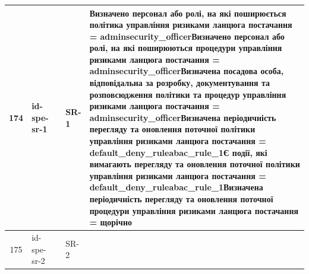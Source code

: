 \documentclass[10pt]{article}
\begin{document}
\begin{longtable}{|c|>{\raggedright\arraybackslash}p{2.5cm}|>{\raggedright\arraybackslash}p{4.5cm}|>{\raggedright\arraybackslash}p{3cm}|>{\raggedright\arraybackslash}p{4.5cm}|}
174 & id-spe-sr-1 &  & SR-1 & Визначено персонал або ролі, на які поширюється політика управління ризиками ланцюга постачання = \textbf{adminsecurity\_\allowbreak{}officer}\newline Визначено персонал або ролі, на які поширюються процедури управління ризиками ланцюга постачання = \textbf{adminsecurity\_\allowbreak{}officer}\newline Визначена посадова особа, відповідальна за розробку, документування та розповсюдження політики та процедур управління ризиками ланцюга постачання = \textbf{adminsecurity\_\allowbreak{}officer}\newline Визначена періодичність перегляду та оновлення поточної політики управління ризиками ланцюга постачання = \textbf{default\_\allowbreak{}deny\_\allowbreak{}ruleabac\_\allowbreak{}rule\_\allowbreak{}1}\newline Є події, які вимагають перегляду та оновлення поточної політики управління ризиками ланцюга постачання = \textbf{default\_\allowbreak{}deny\_\allowbreak{}ruleabac\_\allowbreak{}rule\_\allowbreak{}1}\newline Визначена періодичність перегляду та оновлення поточної процедури управління ризиками ланцюга постачання = \textbf{щорічно} \\ \hline
175 & id-spe-sr-2 &  & SR-2 &  \\ \hline

\end{longtable}
\end{document}
